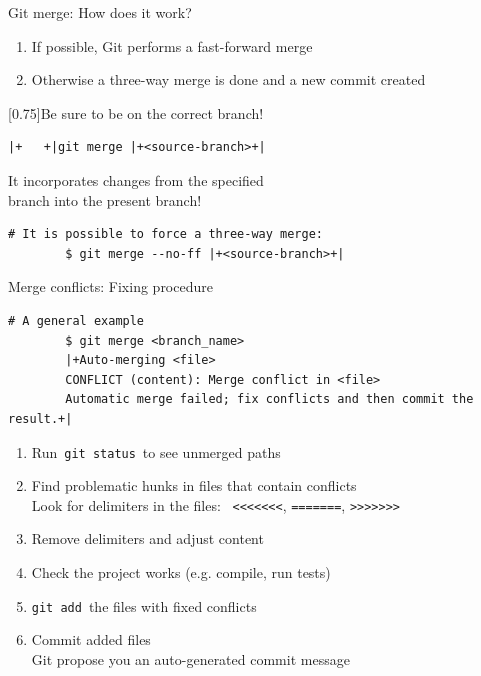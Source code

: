 \documentclass[usenames,svgnames,14pt]{beamer}
\begin{document}
\begin{frame}[fragile]{Git merge: How does it work?}
    \vspace{-3mm}
    \setlength{\leftmargini}{5mm}
    \begin{enumerate}
        \item If possible, Git performs a fast-forward merge
        \item Otherwise a three-way merge is done and a new commit created
    \end{enumerate}
    \begin{varblock}{}[0.75\textwidth]{Be sure to be on the correct branch!}
        \begin{lstlisting}[style=MyBash, xrightmargin=11mm, xleftmargin=11mm, aboveskip=2mm]
            |+   +|git merge |+<source-branch>+|
        \end{lstlisting}
        It incorporates changes from the specified\\ branch into the present branch!
    \end{varblock}
    \vspace{3mm}
    \begin{lstlisting}[style=MyBash]
        # It is possible to force a three-way merge:
        $ git merge --no-ff |+<source-branch>+|
    \end{lstlisting}
\end{frame}
\begin{frame}[fragile]{Merge conflicts: Fixing procedure}
    \begin{lstlisting}[style=MyBash, xleftmargin=-1mm, xrightmargin=-1mm]
        # A general example
        $ git merge <branch_name>
        |+Auto-merging <file>
        CONFLICT (content): Merge conflict in <file>
        Automatic merge failed; fix conflicts and then commit the result.+|
    \end{lstlisting}
    \vspace{3mm}
    \begin{enumerate}
        \small
        \item Run \,\texttt{git status}\, to see \alert{unmerged paths}
        \item Find problematic hunks in files that contain conflicts\\
              \then Look for delimiters in the files:
              {~\footnotesize\texttt{<<<<<<<},\; \texttt{=======},\; \texttt{>>>>>>>}}
        \item Remove delimiters and adjust content
        \item Check the project works (e.g. compile, run tests)
        \item \texttt{git add}\, the files with fixed conflicts
        \item Commit added files\\
              \then Git propose you an auto-generated commit message
    \end{enumerate}
\end{frame}
\end{document}

